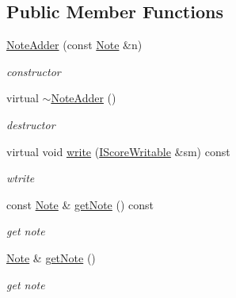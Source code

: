 \subsection*{\-Public \-Member \-Functions}
\begin{DoxyCompactItemize}
\item 
\hypertarget{classsinsy_1_1TempScore_1_1NoteAdder_add45c4f6ed26a9f2dbd924239ba2f185}{\hyperlink{classsinsy_1_1TempScore_1_1NoteAdder_add45c4f6ed26a9f2dbd924239ba2f185}{\-Note\-Adder} (const \hyperlink{classsinsy_1_1Note}{\-Note} \&n)}\label{classsinsy_1_1TempScore_1_1NoteAdder_add45c4f6ed26a9f2dbd924239ba2f185}

\begin{DoxyCompactList}\small\item\em constructor \end{DoxyCompactList}\item 
\hypertarget{classsinsy_1_1TempScore_1_1NoteAdder_a3820c55c959b1a780b4b29f5d141e316}{virtual \hyperlink{classsinsy_1_1TempScore_1_1NoteAdder_a3820c55c959b1a780b4b29f5d141e316}{$\sim$\-Note\-Adder} ()}\label{classsinsy_1_1TempScore_1_1NoteAdder_a3820c55c959b1a780b4b29f5d141e316}

\begin{DoxyCompactList}\small\item\em destructor \end{DoxyCompactList}\item 
virtual void \hyperlink{classsinsy_1_1TempScore_1_1NoteAdder_ab2a04d2b0707df96150ea24ea0e5f143}{write} (\hyperlink{classsinsy_1_1IScoreWritable}{\-I\-Score\-Writable} \&sm) const 
\begin{DoxyCompactList}\small\item\em wtrite \end{DoxyCompactList}\item 
\hypertarget{classsinsy_1_1TempScore_1_1NoteAdder_a8b2f9dbca1733f47d4a184b94933cf38}{const \hyperlink{classsinsy_1_1Note}{\-Note} \& \hyperlink{classsinsy_1_1TempScore_1_1NoteAdder_a8b2f9dbca1733f47d4a184b94933cf38}{get\-Note} () const }\label{classsinsy_1_1TempScore_1_1NoteAdder_a8b2f9dbca1733f47d4a184b94933cf38}

\begin{DoxyCompactList}\small\item\em get note \end{DoxyCompactList}\item 
\hypertarget{classsinsy_1_1TempScore_1_1NoteAdder_af268bca914497861f79ac20026a12b50}{\hyperlink{classsinsy_1_1Note}{\-Note} \& \hyperlink{classsinsy_1_1TempScore_1_1NoteAdder_af268bca914497861f79ac20026a12b50}{get\-Note} ()}\label{classsinsy_1_1TempScore_1_1NoteAdder_af268bca914497861f79ac20026a12b50}

\begin{DoxyCompactList}\small\item\em get note \end{DoxyCompactList}\end{DoxyCompactItemize}



